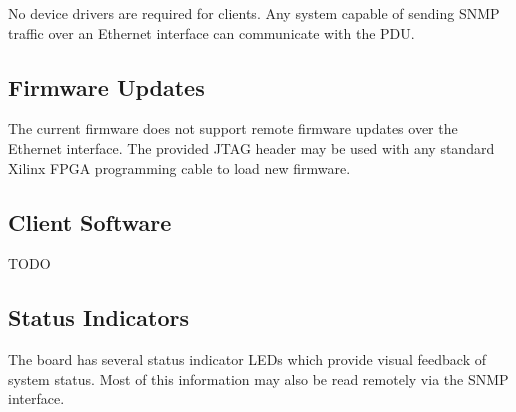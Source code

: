 \documentclass{article}
\begin{document}
No device drivers are required for clients. Any system capable of sending SNMP traffic over an Ethernet interface can 
communicate with the PDU.

\subsection{Firmware Updates}

The current firmware does not support remote firmware updates over the Ethernet interface. The provided JTAG header 
may be used with any standard Xilinx FPGA programming cable to load new firmware.

\subsection{Client Software}

TODO

\subsection{Status Indicators}

The board has several status indicator LEDs which provide visual feedback of system status. Most of this information 
may also be read remotely via the SNMP interface.
\end{document}
